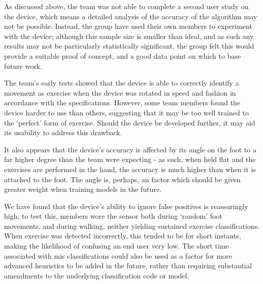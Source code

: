 
As discussed above, the team was not able to complete a second user study on the device, which means a detailed analysis of the accuracy of the algorithm may not be possible. Instead, the group have used their own members to experiment with the device; although this sample size is smaller than ideal, and as such any results may not be particularly statistically significant, the group felt this would provide a suitable proof of concept, and a good data point on which to base future work.

The team's early tests showed that the device is able to correctly identify a movement as exercise when the device was rotated in speed and fashion in accordance with the specifications. However, some team members found the device harder to use than others, suggesting that it may be too well trained to the `perfect' form of exercise. Should the device be developed further, it may aid its usability to address this drawback.

It also appears that the device's accuracy is affected by its angle on the foot to a far higher degree than the team were expecting - as such, when held flat and the exercises are performed in the hand, the accuracy is much higher than when it is attached to the foot. The angle is, perhaps, an factor which should be given greater weight when training models in the future.

We have found that the device's ability to ignore false positives is reassuringly high; to test this, members wore the sensor both during `random' foot movements, and during walking, neither yielding sustained exercise classifications. When exercise was detected incorrectly, this tended to be for short instants, making the likelihood of confusing an end user very low. The short time associated with mis classifications could also be used as a factor for more advanced heuristics to be added in the future, rather than requiring substantial amendments to the underlying classification code or model.
